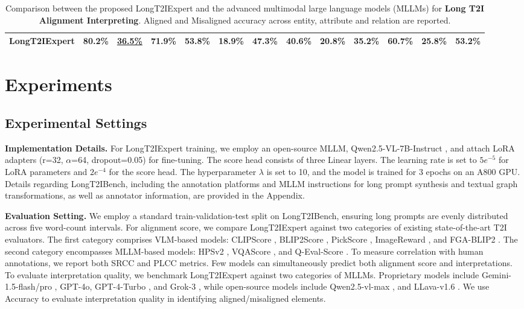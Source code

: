 \documentclass[letterpaper]{article} %
\begin{document}
\begin{table}[t]
\begin{tabular}{l|lll|lll|lll|lll}
		\textbf{LongT2IExpert} & \textbf{80.2\%} & \underline{36.5\%} & \textbf{71.9\%} & \textbf{53.8\%} & \textbf{18.9\%} & \textbf{47.3\%} & \textbf{40.6\%} & \textbf{20.8\%} & \textbf{35.2\%} & \textbf{60.7\%} & \textbf{25.8\%} & \textbf{53.2\%} \\
		\bottomrule
	\end{tabular}
	\caption{Comparison between the proposed LongT2IExpert and the advanced multimodal large language models (MLLMs) for \textbf{Long T2I Alignment Interpreting}. Aligned and Misaligned accuracy across entity, attribute and relation are reported.}
	\label{tab:2}
\end{table}



\section{Experiments}

\subsection{Experimental Settings}

\textbf{Implementation Details.} For LongT2IExpert training, we employ an open-source MLLM,  Qwen2.5-VL-7B-Instruct \cite{bai2023qwen}, and attach LoRA adapters (r=32, $\alpha$=64, dropout=0.05) for fine-tuning. The score head consists of three Linear layers. The learning rate is set to $5e^{-5}$ for LoRA parameters and $2e^{-4}$ for the score head. The hyperparameter $\lambda$ is set to 10, and the model is trained for 3 epochs on an A800 GPU. Details regarding LongT2IBench, including the annotation platforms and MLLM instructions for long prompt synthesis and textual graph transformations, as well as annotator information, are provided in the Appendix.

\textbf{Evaluation Setting.} We employ a standard train-validation-test split on LongT2IBench, ensuring long prompts are evenly distributed across five word-count intervals. For alignment score, we compare LongT2IExpert against two categories of existing state-of-the-art T2I evaluators. The first category comprises VLM-based models: CLIPScore \cite{hessel2021clipscore}, BLIP2Score \cite{li2023blip}, PickScore \cite{li2023blip}, ImageReward \cite{xu2023imagereward}, and FGA-BLIP2 \cite{han2024evalmuse}. The second category encompasses MLLM-based models: HPSv2 \cite{wu2023human}, VQAScore \cite{li2024evaluating}, and Q-Eval-Score \cite{zhang2025q}. To measure correlation with human annotations, we report both SRCC and PLCC metrics. Few models can simultaneously predict both alignment score and interpretations. To evaluate interpretation quality, we benchmark LongT2IExpert against two categories of MLLMs. Proprietary models include Gemini-1.5-flash/pro \cite{team2023gemini}, GPT-4o, GPT-4-Turbo \cite{achiam2023gpt}, and Grok-3 \cite{Grok}, while open-source models include Qwen2.5-vl-max \cite{bai2023qwen}, and LLava-v1.6 \cite{liu2023visual}. We use Accuracy to evaluate interpretation quality in identifying aligned/misaligned elements.
\end{document}
